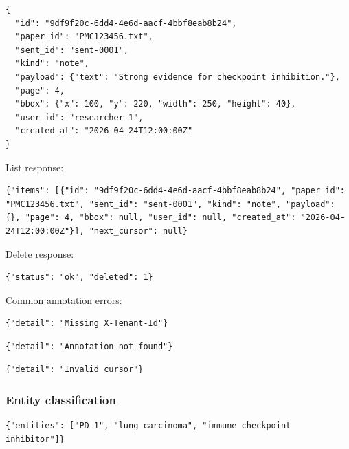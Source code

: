\documentclass[10pt,letterpaper]{article}
\begin{document}
\begin{Verbatim}[fontsize=\scriptsize,breaklines=true,breakanywhere=true]
{
  "id": "9df9f20c-6dd4-4e6d-aacf-4bbf8eab8b24",
  "paper_id": "PMC123456.txt",
  "sent_id": "sent-0001",
  "kind": "note",
  "payload": {"text": "Strong evidence for checkpoint inhibition."},
  "page": 4,
  "bbox": {"x": 100, "y": 220, "width": 250, "height": 40},
  "user_id": "researcher-1",
  "created_at": "2026-04-24T12:00:00Z"
}
\end{Verbatim}

List response:

\begin{Verbatim}[fontsize=\scriptsize,breaklines=true,breakanywhere=true]
{"items": [{"id": "9df9f20c-6dd4-4e6d-aacf-4bbf8eab8b24", "paper_id": "PMC123456.txt", "sent_id": "sent-0001", "kind": "note", "payload": {}, "page": 4, "bbox": null, "user_id": null, "created_at": "2026-04-24T12:00:00Z"}], "next_cursor": null}
\end{Verbatim}

Delete response:

\begin{Verbatim}[fontsize=\scriptsize,breaklines=true,breakanywhere=true]
{"status": "ok", "deleted": 1}
\end{Verbatim}

Common annotation errors:

\begin{Verbatim}[fontsize=\scriptsize,breaklines=true,breakanywhere=true]
{"detail": "Missing X-Tenant-Id"}
\end{Verbatim}

\begin{Verbatim}[fontsize=\scriptsize,breaklines=true,breakanywhere=true]
{"detail": "Annotation not found"}
\end{Verbatim}

\begin{Verbatim}[fontsize=\scriptsize,breaklines=true,breakanywhere=true]
{"detail": "Invalid cursor"}
\end{Verbatim}

\subsubsection{Entity classification}

\begin{Verbatim}[fontsize=\scriptsize,breaklines=true,breakanywhere=true]
{"entities": ["PD-1", "lung carcinoma", "immune checkpoint inhibitor"]}
\end{Verbatim}
\end{document}
